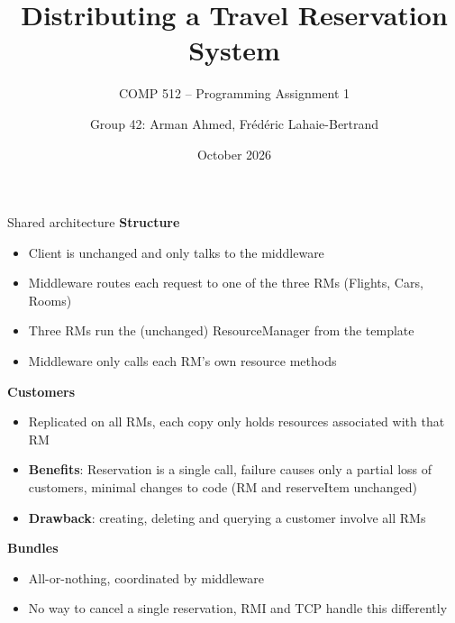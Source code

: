 \documentclass{beamer}
\title{Distributing a Travel Reservation System}
\subtitle{COMP 512 -- Programming Assignment 1}
\author{Group 42: Arman Ahmed, Frédéric Lahaie-Bertrand}
\date{October 2026}
\begin{document}
\maketitle

\begin{frame}{Shared architecture}
  \scriptsize
  \textbf{Structure}
  \begin{itemize}
  \item Client is unchanged and only talks to the middleware
  \item Middleware routes each request to one of the three RMs (Flights, Cars,
    Rooms)
  \item Three RMs run the (unchanged) ResourceManager from the template
  \item Middleware only calls each RM's own resource methods
  \end{itemize}

  \textbf{Customers}
  \begin{itemize}
  \item Replicated on all RMs, each copy only holds resources associated with
    that RM
  \item \textbf{Benefits}: Reservation is a single call, failure causes only a
    partial loss of customers, minimal changes to code (RM and reserveItem
    unchanged)
  \item \textbf{Drawback}: creating, deleting and querying a customer involve
    all RMs
  \end{itemize}

  \textbf{Bundles}
  \begin{itemize}
  \item All-or-nothing, coordinated by middleware
  \item No way to cancel a single reservation, RMI and TCP handle this
    differently
  \end{itemize}
\end{frame}
\end{document}
